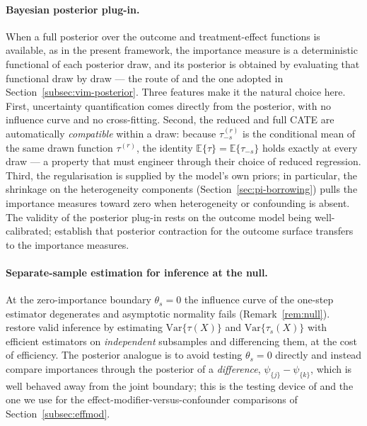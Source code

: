 \documentclass[11pt]{report}
\theoremstyle{plain}
\theoremstyle{definition}
\theoremstyle{remark}
\newcommand{\E}{\mathbb{E}}
\newcommand{\1}{\mathds{1}}
\theoremstyle{plain}
\theoremstyle{remark}
\newcommand{\Var}{\mathrm{Var}}
\begin{document}
\paragraph{Bayesian posterior plug-in.}
When a full posterior over the outcome and treatment-effect functions is
available, as in the present framework, the importance measure is a
deterministic functional of each posterior draw, and its posterior is obtained
by evaluating that functional draw by draw --- the route of \citet{shin2024} and
the one adopted in Section~\ref{subsec:vim-posterior}. Three features make it the
natural choice here. First, uncertainty quantification comes directly from the
posterior, with no influence curve and no cross-fitting. Second, the reduced and
full CATE are automatically \emph{compatible} within a draw: because
$\tau^{(r)}_{-s}$ is the conditional mean of the same drawn function
$\tau^{(r)}$, the identity $\E\{\tau\} = \E\{\tau_{-s}\}$ holds exactly at every
draw --- a property that \citet{hines2022} must engineer through their choice of
reduced regression. Third, the regularisation is supplied by the model's own
priors; in particular, the shrinkage on the heterogeneity components
(Section~\ref{sec:pi-borrowing}) pulls the importance measures toward zero when
heterogeneity or confounding is absent. The validity of the posterior plug-in
rests on the outcome model being well-calibrated; \citet{shin2024} establish
that posterior contraction for the outcome surface transfers to the importance
measures.

\paragraph{Separate-sample estimation for inference at the null.}
At the zero-importance boundary $\theta_s = 0$ the influence curve of the
one-step estimator degenerates and asymptotic normality fails
(Remark~\ref{rem:null}). \citet{hines2022} restore valid inference by estimating
$\Var\{\tau(X)\}$ and $\Var\{\tau_s(X)\}$ with efficient estimators on
\emph{independent} subsamples and differencing them, at the cost of efficiency.
The posterior analogue is to avoid testing $\theta_s = 0$ directly and instead
compare importances through the posterior of a \emph{difference},
$\psi_{\{j\}} - \psi_{\{k\}}$, which is well behaved away from the joint
boundary; this is the testing device of \citet{shin2024} and the one we use for
the effect-modifier-versus-confounder comparisons of
Section~\ref{subsec:effmod}.
\end{document}
